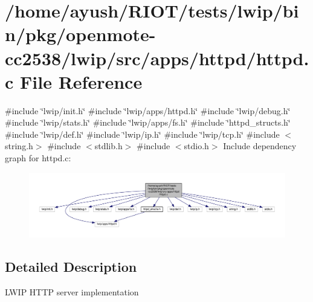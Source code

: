 \hypertarget{openmote-cc2538_2lwip_2src_2apps_2httpd_2httpd_8c}{}\section{/home/ayush/\+R\+I\+O\+T/tests/lwip/bin/pkg/openmote-\/cc2538/lwip/src/apps/httpd/httpd.c File Reference}
\label{openmote-cc2538_2lwip_2src_2apps_2httpd_2httpd_8c}
{\ttfamily \#include \char`\"{}lwip/init.\+h\char`\"{}}\newline
{\ttfamily \#include \char`\"{}lwip/apps/httpd.\+h\char`\"{}}\newline
{\ttfamily \#include \char`\"{}lwip/debug.\+h\char`\"{}}\newline
{\ttfamily \#include \char`\"{}lwip/stats.\+h\char`\"{}}\newline
{\ttfamily \#include \char`\"{}lwip/apps/fs.\+h\char`\"{}}\newline
{\ttfamily \#include \char`\"{}httpd\+\_\+structs.\+h\char`\"{}}\newline
{\ttfamily \#include \char`\"{}lwip/def.\+h\char`\"{}}\newline
{\ttfamily \#include \char`\"{}lwip/ip.\+h\char`\"{}}\newline
{\ttfamily \#include \char`\"{}lwip/tcp.\+h\char`\"{}}\newline
{\ttfamily \#include $<$string.\+h$>$}\newline
{\ttfamily \#include $<$stdlib.\+h$>$}\newline
{\ttfamily \#include $<$stdio.\+h$>$}\newline
Include dependency graph for httpd.\+c\+:
\nopagebreak
\begin{figure}[H]
\begin{center}
\leavevmode
\includegraphics[width=350pt]{openmote-cc2538_2lwip_2src_2apps_2httpd_2httpd_8c__incl}
\end{center}
\end{figure}


\subsection{Detailed Description}
L\+W\+IP H\+T\+TP server implementation 